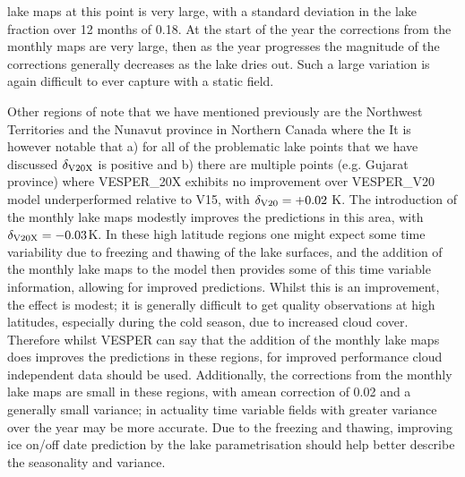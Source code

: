 \documentclass[hess, twostagejnl]{copernicus}
\providecommand{\DIFadd}[1]{{\protect\color{blue} \sf #1}} %
\providecommand{\DIFdel}[1]{{\protect\color{red} \scriptsize #1}} %
\providecommand{\DIFaddbegin}{} %
\providecommand{\DIFaddend}{} %
\providecommand{\DIFdelbegin}{} %
\providecommand{\DIFdelend}{} %
\begin{document}
lake maps at this point is very large, with a standard deviation in the lake fraction over 12 months of 0.18. At the start of the year the corrections from the monthly maps are very large, then as the year progresses the magnitude of the corrections generally decreases as the lake dries out. Such a large variation is again difficult to ever capture with a static field. \newline 

\DIFdelbegin %
\DIFdel{Other regions of note that we have mentioned previously are the Northwest Territories and the Nunavut province in Northern Canada where the }\DIFdelend \DIFaddbegin \DIFadd{It is however notable that a) for all of the problematic lake points that we have discussed $\delta_{\rm V20X}$ is positive and b) there are multiple points (e.g. Gujarat province) where VESPER\_20X exhibits no improvement over VESPER\_}\DIFaddend V20 \DIFdelbegin \DIFdel{model underperformed relative to V15, with $\delta_{\rm V20} = +0.02$ K. The introduction of the monthly lake maps modestly improves the predictions in this area, with $\delta_{\rm V20X} = -0.03$K.  In these high latitude regions one might expect some time variability due to freezing and thawing of the lake surfaces, and the addition of the monthly lake maps to the model then provides some of this time variable information, allowing for improved predictions.  Whilst this is an improvement, the effect is modest; it is generally difficult to get quality observations at high latitudes, especially during the cold season, due to increased cloud cover. Therefore whilst VESPER can say that the addition of the monthly lake maps does improves the predictions in these regions, for improved performance cloud independent data should be used.  Additionally, the corrections from the monthly lake maps are small in these regions, with amean correction of 0.02 and a generally small variance; in actuality time variable fields with greater variance over the year may be more accurate. Due to the freezing and thawing, improving ice on/off date prediction by the lake parametrisation should help better describe the seasonality and variance. }%
\end{document}

